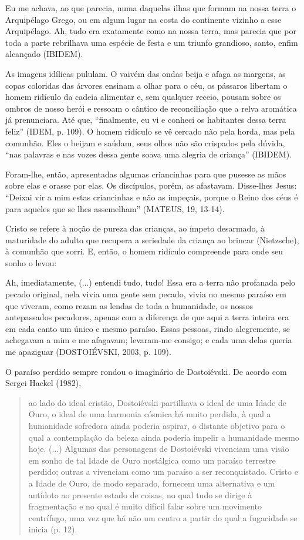 Eu me achava, ao que parecia, numa daquelas ilhas que formam na nossa
terra o Arquipélago Grego, ou em algum lugar na costa do continente
vizinho a esse Arquipélago. Ah, tudo era exatamente como na nossa terra,
mas parecia que por toda a parte rebrilhava uma espécie de festa e um
triunfo grandioso, santo, enfim alcançado (IBIDEM).

As imagens idílicas pululam. O vaivém das ondas beija e afaga as
margens, as copas coloridas das árvores ensinam a olhar para o céu, os
pássaros libertam o homem ridículo da cadeia alimentar e, sem qualquer
receio, pousam sobre os ombros de nosso herói e ressoam o cântico de
reconciliação que a relva aromática já prenunciara. Até que,
``finalmente, eu vi e conheci os habitantes dessa terra feliz'' (IDEM,
p. 109). O homem ridículo se vê cercado não pela horda, mas pela
comunhão. Eles o beijam e saúdam, seus olhos não são crispados pela
dúvida, ``nas palavras e nas vozes dessa gente soava uma alegria de
criança'' (IBIDEM).

Foram-lhe, então, apresentadas algumas criancinhas para que pusesse as
mãos sobre elas e orasse por elas. Os discípulos, porém, as afastavam.
Disse-lhes Jesus: ``Deixai vir a mim estas criancinhas e não as
impeçais, porque o Reino dos céus é para aqueles que se lhes
assemelham'' (MATEUS, 19, 13-14).

Cristo se refere à noção de pureza das crianças, ao ímpeto desarmado, à
maturidade do adulto que recupera a seriedade da criança ao brincar
(Nietzsche), à comunhão que sorri. E, então, o homem ridículo compreende
para onde seu sonho o levou:

Ah, imediatamente, (...) entendi tudo, tudo! Essa era a terra não
profanada pelo pecado original, nela vivia uma gente sem pecado, vivia
no mesmo paraíso em que viveram, como rezam as lendas de toda a
humanidade, os nossos antepassados pecadores, apenas com a diferença de
que aqui a terra inteira era em cada canto um único e mesmo paraíso.
Essas pessoas, rindo alegremente, se achegavam a mim e me afagavam;
levaram-me consigo; e cada uma delas queria me apaziguar (DOSTOIÉVSKI,
2003, p. 109).

O paraíso perdido sempre rondou o imaginário de Dostoiévski. De acordo
com Sergei Hackel (1982),

\begin{quote}
ao lado do ideal cristão, Dostoiévski partilhava o ideal de uma Idade de
Ouro, o ideal de uma harmonia cósmica há muito perdida, à qual a
humanidade sofredora ainda poderia aspirar, o distante objetivo para o
qual a contemplação da beleza ainda poderia impelir a humanidade mesmo
hoje. (...) Algumas das personagens de Dostoiévski vivenciam uma visão
em sonho de tal Idade de Ouro nostálgica como um paraíso terrestre
perdido; outras a vivenciam como um paraíso a ser reconquistado. Cristo
e a Idade de Ouro, de modo separado, fornecem uma alternativa e um
antídoto ao presente estado de coisas, no qual tudo se dirige à
fragmentação e no qual é muito difícil falar sobre um movimento
centrífugo, uma vez que há não um centro a partir do qual a fugacidade
se inicia (p. 12).
\end{quote}

